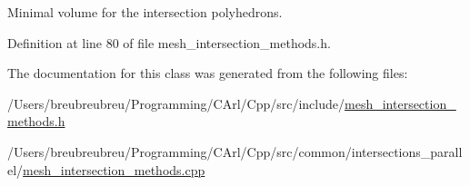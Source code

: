 Minimal volume for the intersection polyhedrons. 



Definition at line 80 of file mesh\+\_\+intersection\+\_\+methods.\+h.



The documentation for this class was generated from the following files\+:\begin{DoxyCompactItemize}
\item 
/\+Users/breubreubreu/\+Programming/\+C\+Arl/\+Cpp/src/include/\hyperlink{mesh__intersection__methods_8h}{mesh\+\_\+intersection\+\_\+methods.\+h}\item 
/\+Users/breubreubreu/\+Programming/\+C\+Arl/\+Cpp/src/common/intersections\+\_\+parallel/\hyperlink{mesh__intersection__methods_8cpp}{mesh\+\_\+intersection\+\_\+methods.\+cpp}\end{DoxyCompactItemize}
